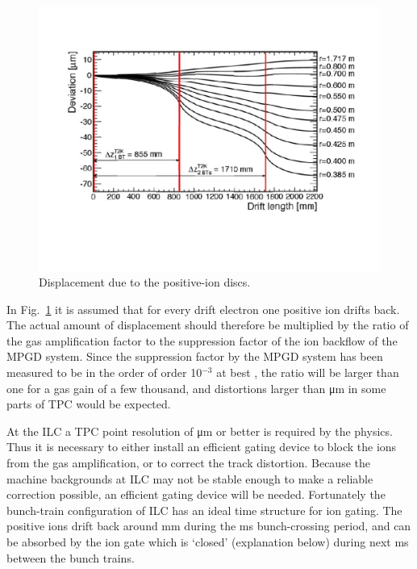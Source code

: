 \begin{figure}[htb!]
\begin{center}
\includegraphics[width=\columnwidth]{Tracker/TPC_Bonn/plots/TPC-Gate_Fig1gating.pdf}%
\caption{\label{Fig1gating} {Displacement due to the positive-ion discs.}}
\end{center}
\end{figure}


In  Fig.~\ref{Fig1gating} it is assumed that for every drift electron one positive ion drifts back.
The actual amount of displacement should therefore be multiplied by the ratio of the gas amplification
factor to the suppression factor of the ion backflow of the MPGD system. Since the suppression factor by the
MPGD system has been measured to be in the order of order 10$^{-3}$ at
best \cite{Fujii_IonEffects}, the ratio will be larger than one for a gas gain of a few thousand, and distortions larger
than \unit[60]{\micro m} in some parts of TPC would be expected.

At the ILC a TPC point resolution of \unit[100]{\micro m} or better is required by the physics. Thus it is
necessary to either install an efficient gating device to block the ions from the gas amplification, or to correct
the track distortion. Because the machine backgrounds at ILC may not be stable enough to make a reliable
correction possible, an efficient gating device will be needed. Fortunately the bunch-train configuration of ILC
has an ideal time structure for ion gating. The positive ions drift back around \unit[5]{mm} during
the \unit[1]{ms} bunch-crossing period, and can be absorbed by the ion gate which is `closed' (explanation
below) during next \unit[200]{ms} between the bunch trains.

